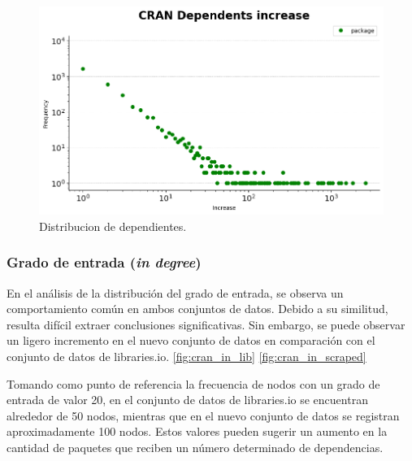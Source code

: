 \begin{figure}[h!]
    \begin{center}
        \includegraphics[width=1\textwidth]{img/cran/dependents_dist.png}
        \caption{Distribucion de dependientes.}
        \label{fig:cran_dependents_dist}
    \end{center}
\end{figure}


\subsubsection{Grado de entrada (\textit{in degree})}


En el análisis de la distribución del grado de entrada, se observa un comportamiento común
en ambos conjuntos de datos. Debido a su similitud, resulta difícil extraer conclusiones
significativas. Sin embargo, se puede observar un ligero incremento en el nuevo conjunto de
datos en comparación con el conjunto de datos de libraries.io. \ref{fig:cran_in_lib} \ref{fig:cran_in_scraped}

Tomando como punto de referencia la frecuencia de nodos con un grado de entrada de valor 20,
en el conjunto de datos de libraries.io se encuentran alrededor de 50 nodos, mientras que en
el nuevo conjunto de datos se registran aproximadamente 100 nodos. Estos valores pueden sugerir
un aumento en la cantidad de paquetes que reciben un número determinado de dependencias.


